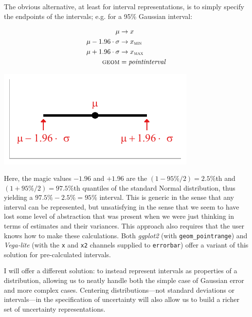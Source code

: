 \documentclass[journal]{vgtc}              %
\begin{document}
The obvious alternative, at least for interval representations, is to simply specify the endpoints of the intervals; e.g. for a 95\% Gaussian interval:

\noindent
\begin{minipage}{.5\columnwidth}
\begin{align*}
\mu &\rightarrow x\\
\mu - 1.96 \cdot \sigma &\rightarrow x_\textsc{min}\\
\mu + 1.96 \cdot \sigma &\rightarrow x_\textsc{max}\\
\textsc{geom} &= \mathit{pointinterval}
\end{align*}
  \end{minipage}%
  \begin{minipage}{.4\columnwidth}
    \centering
    \includegraphics[width=1.2\columnwidth]{figs/2-xmin_xmax_interval.pdf}
  \end{minipage}
\hfill\break

Here, the magic values $-1.96$ and $+1.96$ are the $(1-95\%/2) = 2.5\%$th and $(1+95\%/2) = 97.5\%$th quantiles of the standard Normal distribution, thus yielding a $97.5\% - 2.5\% = 95\%$ interval. This is generic in the sense that any interval can be represented, but unsatisfying in the sense that we seem to have lost some level of abstraction that was present when we were just thinking in terms of estimates and their variances. This approach also requires that the user knows how to make these calculations. Both \textit{ggplot2} (with \texttt{geom\_pointrange}) and \textit{Vega-lite} (with the \texttt{x} and \texttt{x2} channels supplied to \texttt{errorbar}) offer a variant of this solution for pre-calculated intervals. 

I will offer a different solution: to instead represent intervals as properties of a distribution, allowing us to neatly handle both the simple case of Gaussian error and more complex cases. Centering distributions---not standard deviations or intervals---in the specification of uncertainty will also allow us to build a richer set of uncertainty representations.
\end{document}
